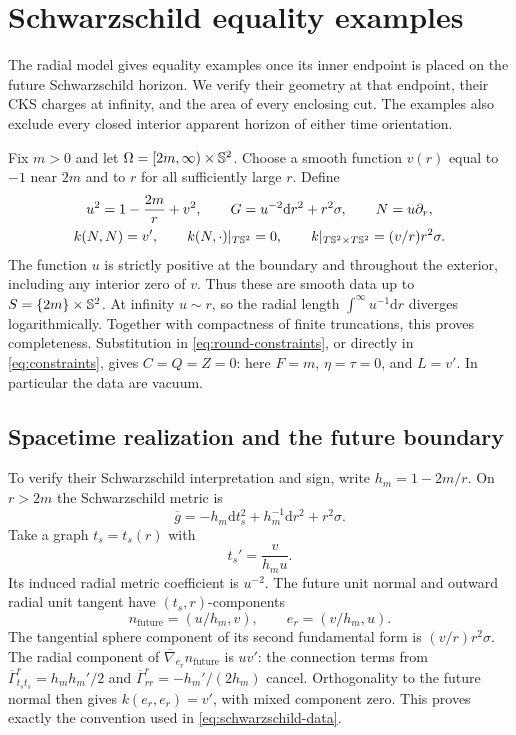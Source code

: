 \section{Schwarzschild equality examples}\label{sec:sharpness}

The radial model gives equality examples once its inner endpoint is
placed on the future Schwarzschild horizon. We verify their geometry
at that endpoint, their CKS charges at infinity, and the area of every
enclosing cut. The examples also exclude every closed interior apparent
horizon of either time orientation.

Fix $m>0$ and let $\Omega=[2m,\infty)\times\mathbb S^2$. Choose a smooth
function $v(r)$ equal to $-1$ near $2m$ and to $r$ for all sufficiently
large $r$. Define
\begin{equation}\label{eq:schwarzschild-data}
\begin{gathered}
 u^2=1-\frac{2m}{r}+v^2,\qquad
 G=u^{-2}\mathrm dr^2+r^2\sigma,\qquad N=u\partial_r,\\
 k(N,N)=v',\qquad k(N,\cdot)|_{T\mathbb S^2}=0,
 \qquad k|_{T\mathbb S^2\times T\mathbb S^2}=(v/r)r^2\sigma.
\end{gathered}
\end{equation}
The function $u$ is strictly positive at the boundary and throughout
the exterior, including any interior zero of $v$. Thus these are smooth
data up to $S=\{2m\}\times\mathbb S^2$. At infinity $u\sim r$, so the radial
length $\int^\infty u^{-1}\mathrm dr$ diverges logarithmically.
Together with compactness of finite truncations, this proves completeness.
Substitution in \eqref{eq:round-constraints}, or directly in
\eqref{eq:constraints}, gives $C=Q=Z=0$: here $F=m$, $\eta=\tau=0$,
and $L=v'$. In particular the data are vacuum.

\subsection{Spacetime realization and the future boundary}
To verify their Schwarzschild interpretation and sign, write
$h_m=1-2m/r$. On $r>2m$ the Schwarzschild metric is
\[
 \overline g=-h_m\mathrm dt_s^2+h_m^{-1}\mathrm dr^2+r^2\sigma.
\]
Take a graph $t_s=t_s(r)$ with
\[
 t_s'=\frac{v}{h_m u}.
\]
Its induced radial metric coefficient is $u^{-2}$. The future unit
normal and outward radial unit tangent have $(t_s,r)$-components
\[
 n_{\mathrm{future}}=(u/h_m,v),\qquad e_r=(v/h_m,u).
\]
The tangential sphere component of its second fundamental form is
$(v/r)r^2\sigma$. The radial component of
$\overline\nabla_{e_r}n_{\mathrm{future}}$ is $uv'$: the connection
terms from
$\overline\Gamma^r_{t_st_s}=h_mh_m'/2$ and
$\overline\Gamma^r_{rr}=-h_m'/(2h_m)$ cancel. Orthogonality to the
future normal then gives $k(e_r,e_r)=v'$, with mixed component zero.
This proves exactly the convention used in \eqref{eq:schwarzschild-data}.

